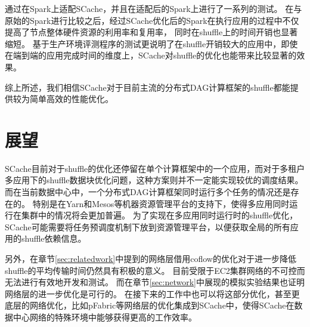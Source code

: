 通过在Spark上适配SCache，并且在适配后的Spark上进行了一系列的测试。
在与原始的Spark进行比较之后，经过SCache优化后的Spark在执行应用的过程中不仅提高了节点整体硬件资源的利用率和复用率，
同时在shuffle上的时间开销也显著缩短。
基于生产环境评测程序的测试更说明了在shuffle开销较大的应用中，即使在端到端的应用完成时间的维度上，SCache对shuffle的优化也能带来比较显著的效果。

综上所述，我们相信SCache对于目前主流的分布式DAG计算框架的shuffle都能提供较为简单高效的性能优化。

\section{展望}

SCache目前对于shuffle的优化还停留在单个计算框架中的一个应用，而对于多租户多应用下的shuffle数据块优化问题，这种方案则并不一定能实现较优的调度结果。
而在当前数据中心中，一个分布式DAG计算框架同时运行多个任务的情况还是存在的。
特别是在Yarn\cite{yarn}和Mesos\cite{mesos}等机器资源管理平台的支持下，使得多应用同时运行在集群中的情况将会更加普遍。
为了实现在多应用同时运行时的shuffle优化，SCache可能需要将任务预调度机制下放到资源管理平台，以便获取全局的所有应用的shuffle依赖信息。

另外，在章节\ref{sec:relatedwork}中提到的网络层借用coflow的优化对于进一步降低shuffle的平均传输时间仍然具有积极的意义。
目前受限于EC2集群网络的不可控而无法进行有效地开发和测试。
而在章节\ref{sec:network}中展现的模拟实验结果也证明网络层的进一步优化是可行的。
在接下来的工作中也可以将这部分优化，甚至更底层的网络优化，比如pFabric\cite{pfabric}等网络层的优化集成到SCache中，使得SCache在数据中心网络的特殊环境中能够获得更高的工作效率。


